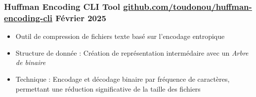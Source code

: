 \documentclass[11pt]{article} %
\begin{document}
\subsubsection{Huffman Encoding CLI Tool \textbar{} \href{https://github.com/Toudonou/huffman-encoding-cli}{\underline{github.com/toudonou/huffman-encoding-cli}} \hfill Février 2025}
\begin{itemize}
	\item Outil de compression de fichiers texte basé sur l'encodage entropique
	\item Structure de donnée : Création de représentation intermédaire avec un \textit{Arbre de binaire}
	\item Technique : Encodage et décodage binaire par fréquence de caractères, permettant une réduction significative de la taille des fichiers
\end{itemize}
\end{document}

